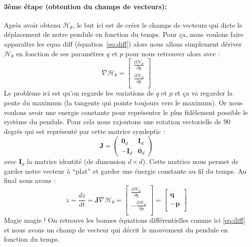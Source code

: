 \documentclass[11pt]{article}
\begin{document}
\paragraph{3ème étape (obtention du champs de vecteurs):}
Après avoir obtenu $\mathcal{H}_{\theta}$, le but ici est de créer le champs de vecteurs qui dicte le déplacement de notre pendule en fonction du temps. Pour ça, nous voulons faire apparaître les equa diff (équation~\ref{eq:diff}) alors nous allons simplement dériver $\mathcal{H}_{\theta}$ en fonction de ses paramètres $q$ et $p$ pour nous retrouver alors avec :
\begin{equation}
 \nabla \mathcal{H}_{\theta} = \begin{bmatrix}
                       \frac{\partial \mathcal{H}_{\theta}}{\partial q} \\
                       \frac{\partial \mathcal{H}_{\theta}}{\partial p} \\
                      \end{bmatrix}
\end{equation}
Le problème ici est qu'on regarde les variations de $q$ et $p$ et ça va regarder la pente du maximum (la tangente qui pointe toujours vers le maximum). Or nous voulons avoir une energie constante pour représenter le plus fidèlement possible le système du pendule. Pour cela nous rajoutons une rotation vectorielle de 90 degrés qui est représenté par cette matrice symleptic :
\begin{equation}
 \mathbf{J} = \begin{pmatrix}
      \mathbf{0}_d & \mathbf{I}_d \\
      - \mathbf{I}_d & \mathbf{0}_d
     \end{pmatrix}
\end{equation}
avec $\mathbf{I}_d$ la matrice identité (de dimension $d \times d$). Cette matrice nous permet de garder notre vecteur à ``plat'' et garder une énergie constante au fil du temps. Au final nous avons :
\begin{equation}
 \dot z = \frac{dz}{dt} = \mathbf{J} \nabla \mathcal{H}_{\theta} = \begin{bmatrix}
                                                                     \frac{\partial \mathcal{H}_{\theta}}{\partial q} \\
                                                                    - \frac{\partial \mathcal{H}_{\theta}}{\partial p} \\
                                                                   \end{bmatrix} = \begin{bmatrix}
                                                                    \dot{\mathbf{q}} \\
                                                                    - \dot{\mathbf{p}} \\
                                                                   \end{bmatrix}
\end{equation}
Magie magie ! On retrouve les bonnes équations différentielles comme ici \ref{eq:diff} et nous avons un champ de vecteur qui décrit le mouvement du pendule en fonction du temps.
\end{document}
